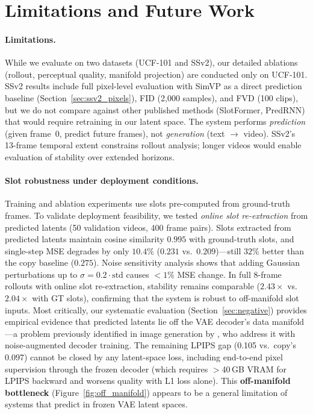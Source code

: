 \documentclass{article}
\begin{document}
\section{Limitations and Future Work}
\label{sec:limitations}

\paragraph{Limitations.}
While we evaluate on two datasets (UCF-101 and SSv2), our detailed
ablations (rollout, perceptual quality, manifold projection) are
conducted only on UCF-101.
SSv2 results include full pixel-level evaluation with SimVP as a
direct prediction baseline (Section~\ref{sec:ssv2_pixels}), FID
(2{,}000 samples), and FVD (100 clips), but we do not compare against
other published methods (SlotFormer, PredRNN) that would require
retraining in our latent space.
The system performs \emph{prediction} (given frame~0, predict future
frames), not \emph{generation} (text $\to$ video).
SSv2's 13-frame temporal extent constrains rollout analysis; longer
videos would enable evaluation of stability over extended horizons.

\paragraph{Slot robustness under deployment conditions.}
Training and ablation experiments use slots pre-computed from
ground-truth frames. To validate deployment feasibility, we tested
\emph{online slot re-extraction} from predicted latents
(50 validation videos, 400 frame pairs).
Slots extracted from predicted latents maintain cosine similarity
$0.995$ with ground-truth slots, and single-step MSE degrades by
only $10.4\%$ ($0.231$ vs.\ $0.209$)---still $32\%$ better than
the copy baseline ($0.275$).
Noise sensitivity analysis shows that adding Gaussian perturbations
up to $\sigma{=}0.2 \cdot \text{std}$ causes $<\!1\%$ MSE change.
In full 8-frame rollouts with online slot re-extraction, stability
remains comparable ($2.43\times$ vs.\ $2.04\times$ with GT slots),
confirming that the system is robust to off-manifold slot inputs.
Most critically, our systematic evaluation (Section~\ref{sec:negative})
provides empirical evidence that predicted latents lie off the VAE
decoder's data manifold---a problem previously identified in image
generation by \cite{zheng2025raedit}, who address it with
noise-augmented decoder training.
The remaining LPIPS gap (0.105 vs.\ copy's 0.097) cannot be closed by
any latent-space loss, including end-to-end pixel supervision through
the frozen decoder (which requires $>$40\,GB VRAM for LPIPS backward
and worsens quality with L1 loss alone).
This \textbf{off-manifold bottleneck} (Figure~\ref{fig:off_manifold})
appears to be a general limitation of systems that predict in frozen
VAE latent spaces.
\end{document}
